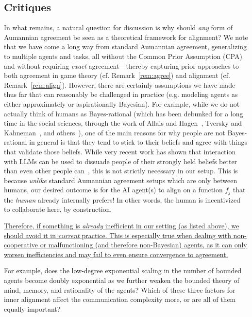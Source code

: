 \subsection{Critiques}
\label{ss:discussion-critiques}
In what remains, a natural question for discussion is why should \emph{any} form of Aumannian agreement be seen as a theoretical framework for alignment? 
We note that we have come a long way from standard Aumannian agreement, generalizing to multiple agents and tasks, all without the Common Prior Assumption (CPA) and without requiring \emph{exact} agreement---thereby capturing prior approaches to both agreement in game theory (cf. Remark~\ref{rem:agree}) and alignment (cf. Remark~\ref{rem:align}).
However, there are certainly assumptions we have made thus far that can reasonably be challenged in practice (e.g. modeling agents as either approximately or aspirationally Bayesian).
For example, while we do not actually think of humans as Bayes-rational (which has been debunked for a long time in the social sciences, through the work of Allais and Hagen~\citep{allais_hagen_1979}, Tversky and Kahneman~\citep{tversky_kahneman_1974}, and others~\citep{windt_safety_2019}), one of the main reasons for why people are not Bayes-rational in general is that they tend to stick to their beliefs and agree with things that validate those beliefs.
While very recent work has shown that interaction with LLMs can be used to dissuade people of their strongly held beliefs better than even other people can~\citep{costello2024durably}, this is not strictly necessary in our setup.
This is because \emph{unlike} standard Aumannian agreement setups which are only between humans, our desired outcome is for the AI agent(s) to align on a function $f_j$ that the \emph{human} already internally prefers!
In other words, the human is incentivized to collaborate here, by construction.

\uline{Therefore, if something is \emph{already} inefficient in our setting (as listed above), we should avoid it in \emph{current} practice. 
This is especially true when dealing with non-cooperative or malfunctioning (and therefore non-Bayesian) agents, as it can only worsen inefficiencies and may fail to even ensure convergence to agreement.}

For example, does the low-degree exponential scaling in the number of bounded agents become doubly exponential as we further weaken the bounded theory of mind, memory, and rationality of the agents?
Which of these three factors for inner alignment affect the communication complexity more, or are all of them equally important?


